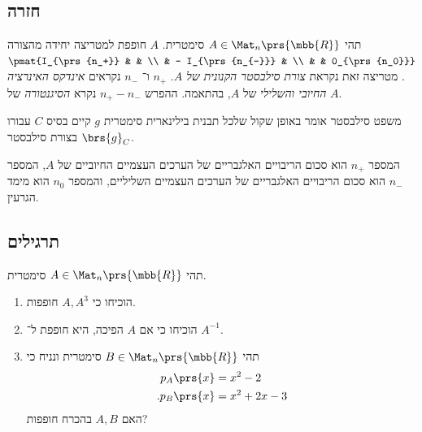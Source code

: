 \documentclass[a4paper,10pt,twoside,openany]{book}
\begin{document}
\subsection{חזרה}

\begin{theorem}[סילבסטר]
תהי
$A \in \Mat_n\prs{\mbb{R}}$
סימטרית.
$A$
חופפת למטריצה יחידה מהצורה
$\pmat{I_{\prs{n_+}} & & \\ & - I_{\prs{n_{-}}} & \\ & & 0_{\prs{n_0}}}$.
מטריצה זאת נקראת
\emph{צורת סילבסטר הקנונית של
$A$}.
$n_+$
ו־%
$n_-$
נקראים
\emph{אינדקס האינרציה החיובי והשלילי}
של
$A$,
בהתאמה.
ההפרש
$n_+ - n_-$
נקרא
\emph{הסיגנטורה}
של
$A$.
\end{theorem}

\begin{remark}
משפט סילבסטר אומר באופן שקול שלכל תבנית בילינארית סימטרית
$g$
קיים בסיס
$C$
עבורו
$\brs{g}_C$
בצורת סילבסטר.
\end{remark}

\begin{fact}
המספר
$n_+$
הוא סכום הריבויים האלגבריים של הערכים העצמיים החיוביים של
$A$,
המספר
$n_{-}$
הוא סכום הריבויים האלגבריים של הערכים העצמיים השליליים, והמספר
$n_0$
הוא מימד הגרעין.
\end{fact}

\subsection{תרגילים}

\begin{exercisechap}
תהי
$A \in \Mat_n\prs{\mbb{R}}$
סימטרית.
\begin{enumerate}
\item הוכיחו כי
$A, A^3$
חופפות.
\item הוכיחו כי אם
$A$
הפיכה, היא חופפת ל־%
$A^{-1}$.
\item תהי
$B \in \Mat_n\prs{\mbb{R}}$
סימטרית
ונניח כי
\begin{align*}
p_A\prs{x} &= x^2 - 2 \\
\text{.} p_B\prs{x} &= x^2 + 2x - 3
\end{align*}
האם
$A,B$
בהכרח חופפות?
\end{enumerate}
\end{exercisechap}
\end{document}
